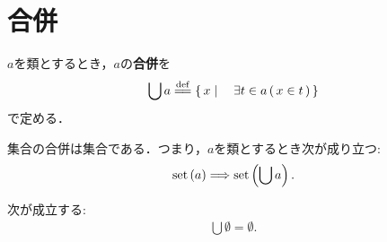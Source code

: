 \section{合併}
	\begin{screen}
		\begin{dfn}[合併]
			$a$を類とするとき，$a$の{\bf 合併}を
			\begin{align}
				\bigcup a \defeq \Set{x}{\exists t \in a\, (\, x \in t\, )}
				\label{eq:definition_of_union_1}
			\end{align}
			で定める．
		\end{dfn}
	\end{screen}
	
	\begin{screen}
		\begin{axm}[合併の公理]
			集合の合併は集合である．つまり，$a$を類とするとき次が成り立つ:
			\begin{align}
				\operatorname*{set} \left(a\right) \Longrightarrow \operatorname*{set} \left(\bigcup a\right).
			\end{align}
		\end{axm}
	\end{screen}
	
	\begin{screen}
		\begin{thm}[空集合の合併は空]\label{thm:the_union_of_the_emptyset_is_empty}
			次が成立する:
			\begin{align}
				\bigcup \emptyset = \emptyset.
			\end{align}
		\end{thm}
	\end{screen}
	
